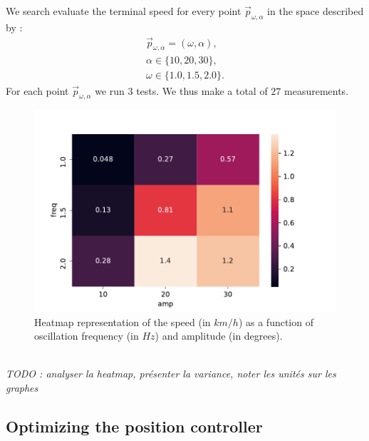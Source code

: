 \documentclass[11pt]{article}
\begin{document}
We search evaluate the terminal speed for every point $\vec{p}_{\omega,\alpha}$ in the space described by :
\begin{align*}
    \vec{p}_{\omega,\alpha} = (\omega, \alpha), \\
    \alpha \in \{ 10, 20, 30 \}, \\
    \omega \in \{ 1.0, 1.5, 2.0 \}. 
\end{align*}
For each point $\vec{p}_{\omega,\alpha}$ we run $3$ tests. We thus make a total of $27$ measurements. 



\begin{figure}
    \centering
    \includegraphics{figures/heatmap_speed.pdf}
    \caption{Heatmap representation of the speed (in $km/h$) as a function of oscillation frequency (in $Hz$) and amplitude (in degrees).}
    \label{fig:heatmap_speed}
\end{figure}
\\
\textit{TODO : analyser la heatmap, présenter la variance, noter les unités sur les graphes}
\\

\subsection{Optimizing the position controller}

\printbibliography %
\end{document}
